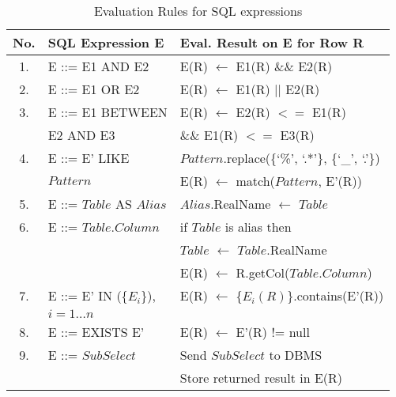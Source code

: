 \begin{table}[t]
    \centering 
    \caption{Evaluation Rules for SQL expressions}\label{tab:transformation-rules}
\begin{tabular}{@{}cll@{}}
    \toprule
    \textbf{No.} & \textbf{SQL Expression E} & \textbf{Eval. Result on E for Row R} \\
    \midrule
    1.  & E ::= E1 AND E2     &   E(R) $\leftarrow$ E1(R) \&\& E2(R) \\
    \midrule
    2.  & E ::= E1 OR E2      &   E(R) $\leftarrow$ E1(R) $||$ E2(R) \\
    \midrule
    3.  & E ::= E1 BETWEEN    &   E(R) $\leftarrow$ E2(R) $<=$ E1(R)  \\
        & \hspace{30pt} E2 AND E3       & \hspace{30pt} \&\& E1(R) $<=$ E3(R) \\
    \midrule
    4.  & E ::= E' LIKE               &   $Pattern$.replace(\{`\%', `.*'\}, \{`\_', `.'\}) \\
        & \hspace{30pt} $Pattern$     &   E(R) $\leftarrow$ match($Pattern$, E'(R)) \\
    \midrule
    5.  & E ::= $Table$ AS $Alias$   & $Alias$.RealName $\leftarrow$ $Table$ \\
    \midrule
    6.  & E ::= $Table$.$Column$      &   if $Table$ is alias then \\
        &                               &   \hspace{15pt}$Table$ $\leftarrow$ $Table$.RealName \\
        &                              & E(R) $\leftarrow$ R.getCol($Table$.$Column$) \\
    \midrule
    7.  & E ::= E' IN (\{$E_i$\}),    &   E(R) $\leftarrow$ \{$E_i(R)$\}.contains(E'(R)) \\
        & \hspace{30pt} $i = 1 \ldots n$ \\
    \midrule
    8.  & E ::= EXISTS E'             &   E(R) $\leftarrow$ E'(R) != null \\
    \midrule
    9. & E ::= $SubSelect$          &   Send $SubSelect$ to DBMS \\
       &                            &   Store returned result in E(R) \\
    \bottomrule
\end{tabular}
\end{table}


